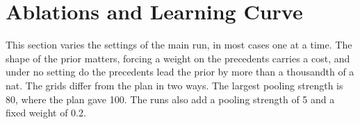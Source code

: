 \section{Ablations and Learning Curve}
\label{sec:ablations}
This section varies the settings of the main run, in most cases one at a time. The shape of the prior matters, forcing a weight on the precedents carries a cost, and under no setting do the precedents lead the prior by more than a thousandth of a nat.
The grids differ from the plan in two ways. The largest pooling strength is 80, where the plan gave 100. The runs also add a pooling strength of 5 and a fixed weight of 0.2.

